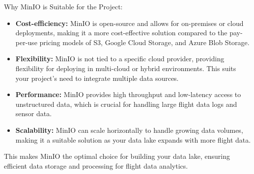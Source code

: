 \documentclass[12pt,a4paper]{article}
\begin{document}
Why MinIO is Suitable for the Project:
\begin{itemize}
    \item \textbf{Cost-efficiency:} MinIO is open-source and allows for
    on-premises or cloud deployments, making it a more cost-effective solution
    compared to the pay-per-use pricing models of S3, Google Cloud Storage, and
    Azure Blob Storage.
    \item \textbf{Flexibility:} MinIO is not tied to a specific cloud provider,
    providing flexibility for deploying in multi-cloud or hybrid environments.
    This suits your project’s need to integrate multiple data sources.
    \item \textbf{Performance:} MinIO provides high throughput and low-latency
    access to unstructured data, which is crucial for handling large flight data
    logs and sensor data.
    \item \textbf{Scalability:} MinIO can scale horizontally to handle growing
    data volumes, making it a suitable solution as your data lake expands with
    more flight data.
\end{itemize}
This makes MinIO the optimal choice for building your data lake, ensuring
efficient data storage and processing for flight data analytics.
\end{document}
